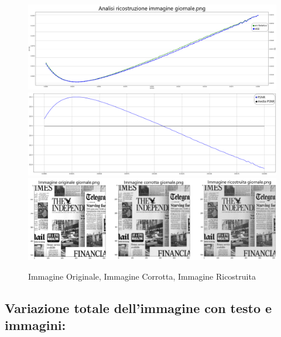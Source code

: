 \begin{figure}[H]
    \centering
    \includegraphics[width=\textwidth]{IMMAGINI_RELAZIONE/graficoGiornaleTOTVAR_ERRREL&MSE.png}
    \includegraphics[width=\textwidth]{IMMAGINI_RELAZIONE/graficoGiornaleTOTVAR_PSNR&suaMedia.png}
    \includegraphics[width=\textwidth]{imgRicostruzione/ricostruzioneGiornale_TOTVAR_maxPSNR23.20.png}
    \caption{Immagine Originale, Immagine Corrotta, Immagine Ricostruita}
\end{figure}
\newpage
{\color{rred}\subsection{Variazione totale dell'immagine con testo e immagini:}}

